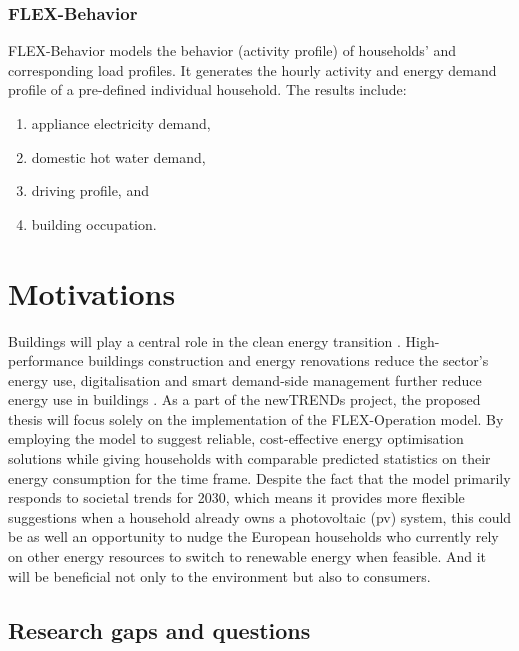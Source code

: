\subsubsection{FLEX-Behavior}


FLEX-Behavior models the behavior (activity profile) of households' and corresponding load profiles. 
It generates the hourly activity and energy demand profile of a pre-defined individual household. 
The results include: 

\begin{enumerate}
  \item appliance electricity demand,
  \item domestic hot water demand,
  \item driving profile, and
  \item building occupation.
\end{enumerate}




\section{Motivations}




Buildings will play a central role in the clean energy transition \cite{building}.
High-performance buildings construction and energy renovations reduce the sector’s energy use, digitalisation and smart demand-side management further reduce energy use in buildings \cite{building}.  
As a part of the newTRENDs project, 
the proposed thesis will focus solely on the implementation of the FLEX-Operation model.  
By employing the model to 
suggest reliable, cost-effective energy optimisation solutions 
while giving households with comparable predicted statistics on their energy consumption for the time frame. 
Despite the fact that the model primarily responds to societal trends for 2030, 
which means it provides more flexible suggestions when a household already owns a photovoltaic (\gls{pv}) system, 
this could be as well an opportunity to nudge the European households who currently rely on other energy resources
to switch to renewable energy when feasible. 
And it will be beneficial not only to the environment but also to consumers. 


\subsection{Research gaps and questions}


